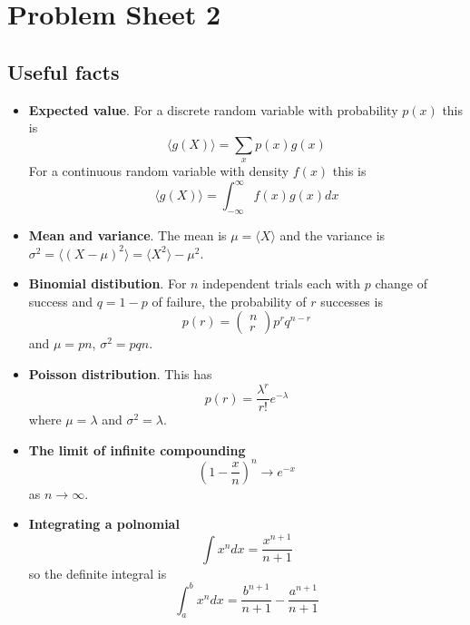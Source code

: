 \documentclass[11pt,a4paper]{scrartcl}
\begin{document}
\section*{Problem Sheet 2}

\subsection*{Useful facts}

\begin{itemize}

\item \textbf{Expected value}. For a discrete random variable with probability $p(x)$ this is
\begin{equation}
\langle g(X) \rangle = \sum_x p(x)g(x)
\end{equation}
For a continuous random variable with density $f(x)$ this is
\begin{equation}
\langle g(X)\rangle = \int_{-\infty}^\infty{f(x)g(x)}dx
\end{equation}


\item \textbf{Mean and variance}. The mean is $\mu=\langle X\rangle$ and the variance is $\sigma^2=\langle(X-\mu)^2\rangle=\langle X^2\rangle - \mu^2$.

\item \textbf{Binomial distibution}. For $n$ independent trials each with $p$ change of success and $q=1-p$ of failure, the probability of $r$ successes is 
\begin{equation}
p(r)=\left(\begin{array}{c}n\\r\end{array}\right)p^rq^{n-r}
\end{equation}
and $\mu=pn$, $\sigma^2=pqn$.

\item \textbf{Poisson distribution}. This has
\begin{equation}
p(r)=\frac{\lambda^r}{r!}e^{-\lambda}
\end{equation}
where $\mu=\lambda$ and $\sigma^2=\lambda$.


\item \textbf{The limit of infinite compounding}
  \begin{equation}
    \left(1-\frac{x}{n}\right)^n\rightarrow e^{-x}
  \end{equation}
  as $n\rightarrow\infty$.

\item \textbf{Integrating a polnomial}
\begin{equation}
\int x^n dx=\frac{x^{n+1}}{n+1}
\end{equation}
so the definite integral is
\begin{equation}
\int_{a}^b x^n dx=\frac{b^{n+1}}{n+1}-\frac{a^{n+1}}{n+1}
\end{equation}

\end{itemize}
\end{document}
